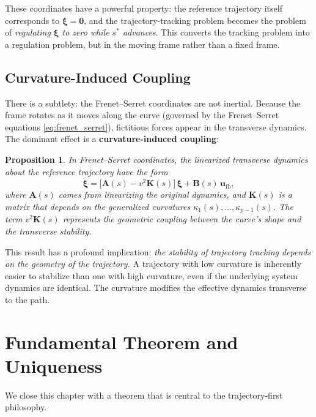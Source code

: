 \documentclass[12pt, openany]{book}
\theoremstyle{plain}
\newtheorem{proposition}{Proposition}[chapter]
\newcommand{\control}{\bm{u}}
\begin{document}
These coordinates have a powerful property: the reference trajectory itself
corresponds to $\bm{\xi} = \bm{0}$, and the trajectory-tracking problem
becomes the problem of \emph{regulating $\bm{\xi}$ to zero while $s^*$
advances}. This converts the tracking problem into a regulation problem, but in
the moving frame rather than a fixed frame.

\subsection{Curvature-Induced Coupling}

There is a subtlety: the Frenet--Serret coordinates are not inertial. Because
the frame rotates as it moves along the curve (governed by the Frenet--Serret
equations \eqref{eq:frenet_serret}), fictitious forces appear in the transverse
dynamics. The dominant effect is a \textbf{curvature-induced coupling}:

\begin{proposition}\label{prop:curv_coupling}
  In Frenet--Serret coordinates, the linearized transverse dynamics about the
  reference trajectory have the form
  \begin{equation}\label{eq:transverse_lin}
    \dot{\bm{\xi}} = \bigl[\bm{A}(s) - v^2 \bm{K}(s)\bigr]\, \bm{\xi}
    + \bm{B}(s)\, \control_{\text{fb}},
  \end{equation}
  where $\bm{A}(s)$ comes from linearizing the original dynamics, and
  $\bm{K}(s)$ is a matrix that depends on the generalized curvatures
  $\kappa_1(s), \ldots, \kappa_{p-1}(s)$. The term $v^2\bm{K}(s)$ represents
  the geometric coupling between the curve's shape and the transverse stability.
\end{proposition}

This result has a profound implication: \emph{the stability of trajectory
tracking depends on the geometry of the trajectory.} A trajectory with low
curvature is inherently easier to stabilize than one with high curvature,
even if the underlying system dynamics are identical. The curvature modifies
the effective dynamics transverse to the path.

\section{Fundamental Theorem and Uniqueness}

We close this chapter with a theorem that is central to the trajectory-first
philosophy.
\end{document}
